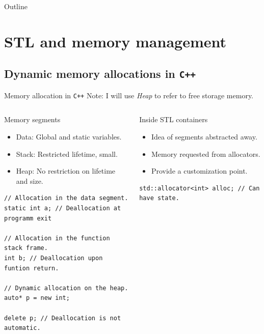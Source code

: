 \documentclass[10pt,aspectratio=169]{beamer}
\begin{document}
\begin{frame}{Outline}
   \tableofcontents
\end{frame}

\section{STL and memory management}

\subsection{Dynamic memory allocations in \texttt{C++}}

\begin{frame}[fragile]{Memory allocation in \texttt{C++}}
{Note: I will use {\it Heap} to refer to free storage memory.}
\begin{columns}
\begin{column}[t]{0.45\textwidth}
\begin{block}{Memory segments}
\begin{itemize}
\item Data: Global and static variables.
\item Stack: Restricted lifetime, small.
\item Heap: No restriction on lifetime and size.
\end{itemize}
\end{block}
\begin{lstlisting}
// Allocation in the data segment.
static int a; // Deallocation at programm exit

// Allocation in the function stack frame.
int b; // Deallocation upon funtion return.

// Dynamic allocation on the heap.
auto* p = new int;

delete p; // Deallocation is not automatic.
\end{lstlisting}
\end{column}

\begin{column}[t]{0.45\textwidth}
\begin{block}{Inside STL containers}
\begin{itemize}
\item Idea of segments abstracted away.
\item Memory requested from allocators.
\item Provide a customization point.
\end{itemize}
\end{block}
\begin{lstlisting}
std::allocator<int> alloc; // Can have state.


\end{lstlisting}
\end{column}
\end{columns}
\end{frame}
\end{document}
